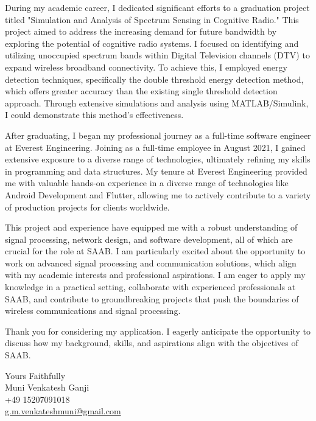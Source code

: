 \documentclass[11pt,a4]{article}
\begin{document}
\par During my academic career, I dedicated significant efforts to a graduation project titled "Simulation and Analysis of Spectrum Sensing in Cognitive Radio." This project aimed to address the increasing demand for future bandwidth by exploring the potential of cognitive radio systems. I focused on identifying and utilizing unoccupied spectrum bands within Digital Television channels (DTV) to expand wireless broadband connectivity. To achieve this, I employed energy detection techniques, specifically the double threshold energy detection method, which offers greater accuracy than the existing single threshold detection approach. Through extensive simulations and analysis using MATLAB/Simulink, I could demonstrate this method's effectiveness.

\par After graduating, I began my professional journey as a full-time software engineer at Everest Engineering. Joining as a full-time employee in August 2021, I gained extensive exposure to a diverse range of technologies, ultimately refining my skills in programming and data structures. My tenure at Everest Engineering provided me with valuable hands-on experience in a diverse range of technologies like Android Development and Flutter, allowing me to actively contribute to a variety of production projects for clients worldwide.

\par This project and experience have equipped me with a robust understanding of signal processing, network design, and software development, all of which are crucial for the role at SAAB. I am particularly excited about the opportunity to work on advanced signal processing and communication solutions, which align with my academic interests and professional aspirations. I am eager to apply my knowledge in a practical setting, collaborate with experienced professionals at SAAB, and contribute to groundbreaking projects that push the boundaries of wireless communications and signal processing.

\par Thank you for considering my application. I eagerly anticipate the opportunity to discuss how my background, skills, and aspirations align with the objectives of SAAB.


\vspace{0.5cm}
\raggedright
Yours Faithfully \\ Muni Venkatesh Ganji \\ +49 15207091018 \\ \href{mailto:g.m.venkateshmuni@gmail.com}{g.m.venkateshmuni@gmail.com}
\end{document}
